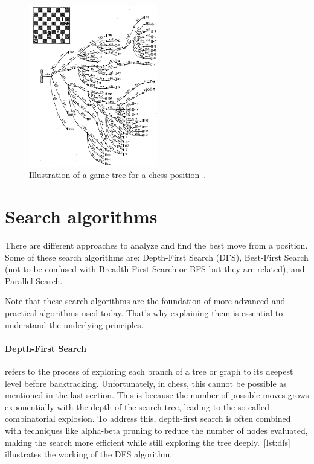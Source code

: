 \begin{figure}[h]
    \centering
    \includegraphics[width=0.5\textwidth]{Imagenes/chess-game-tree.jpg}
    \caption{Illustration of a game tree for a chess position~\cite{BotvinnikLongRangePlanning}.}\label{fig:game-tree}
\end{figure}

\newpage

\section{Search algorithms}

There are different approaches to analyze and find the best move from a position. Some of these search algorithms are: Depth-First Search (DFS), Best-First Search (not to be confused with Breadth-First Search or BFS but they are related), and Parallel Search.

\vspace{1em}

\noindent Note that these search algorithms are the foundation of more advanced and practical algorithms used today. That's why explaining them is essential to understand the underlying principles.

\paragraph{Depth-First Search} refers to the process of exploring each branch of a tree or graph to its deepest level before backtracking. Unfortunately, in chess, this cannot be possible as mentioned in the last section. This is because the number of possible moves grows exponentially with the depth of the search tree, leading to the so-called combinatorial explosion. To address this, depth-first search is often combined with techniques like alpha-beta pruning to reduce the number of nodes evaluated, making the search more efficient while still exploring the tree deeply.~\cref{lst:dfs} illustrates the working of the DFS algorithm.

